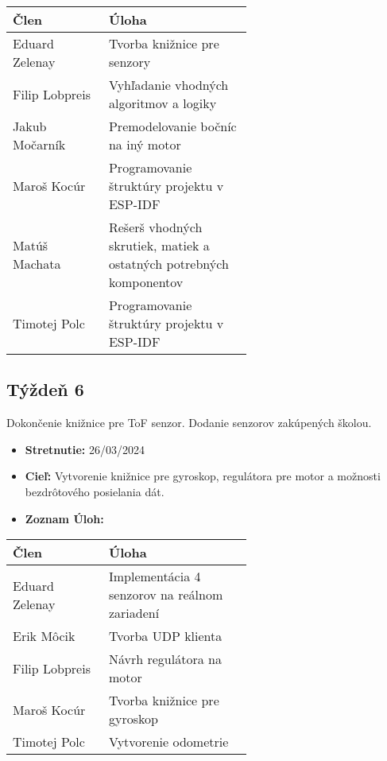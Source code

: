 \begin{table}[H]
    \centering
    \begin{tabular}{|l|p{0.6\linewidth}|}
        \hline
        \textbf{Člen} & \textbf{Úloha} \\
        \hline
        Eduard Zelenay & Tvorba knižnice pre senzory \\
        \hline
        Filip Lobpreis & Vyhľadanie vhodných algoritmov a logiky \\
        \hline
        Jakub Močarník & Premodelovanie bočníc na iný motor \\
        \hline
        Maroš Kocúr & Programovanie štruktúry projektu v ESP-IDF \\
        \hline
        Matúš Machata & Rešerš vhodných skrutiek, matiek a ostatných potrebných komponentov \\
        \hline
        Timotej Polc & Programovanie štruktúry projektu v ESP-IDF \\
        \hline
    \end{tabular}
\end{table}

\subsection{Týždeň 6}
Dokončenie knižnice pre ToF senzor. Dodanie senzorov zakúpených školou. 
\begin{itemize}
    \item \textbf{Stretnutie:} 26/03/2024
    \item \textbf{Cieľ: } Vytvorenie knižnice pre gyroskop, regulátora pre motor a možnosti bezdrôtového posielania dát.
    \item \textbf{Zoznam Úloh:}
\end{itemize}

\begin{table}[H]
    \centering
    \begin{tabular}{|l|p{0.6\linewidth}|}
        \hline
        \textbf{Člen} & \textbf{Úloha} \\
        \hline
        Eduard Zelenay & Implementácia 4 senzorov na reálnom zariadení \\
        \hline
        Erik Môcik & Tvorba UDP klienta \\
        \hline
        Filip Lobpreis & Návrh regulátora na motor \\
        \hline
        Maroš Kocúr & Tvorba knižnice pre gyroskop \\
        \hline
        Timotej Polc & Vytvorenie odometrie \\
        \hline
    \end{tabular}
\end{table}

